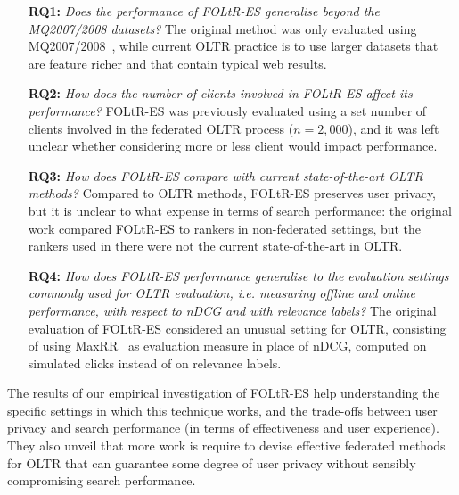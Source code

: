 \begin{itemize}
	\item[\bf RQ1:] \textit{Does the performance of FOLtR-ES generalise beyond the MQ2007/2008 datasets?} The original method was only evaluated using MQ2007/2008~\cite{DBLP:journals/corr/QinL13}, while current OLTR practice is to use larger datasets that are feature richer and that contain typical web results.
	\item[\bf RQ2:] \textit{How does the number of clients involved in FOLtR-ES affect its performance?} FOLtR-ES was previously evaluated using a set number of clients involved in the federated OLTR process ($n=2,000$), and it was left unclear whether considering more or less client would impact performance.
	\item[\bf RQ3:] \textit{How does FOLtR-ES compare with current state-of-the-art OLTR methods?} Compared to OLTR methods, FOLtR-ES preserves user privacy, but it is unclear to what expense in terms of search performance: the original work compared FOLtR-ES to rankers in non-federated settings, but the rankers used in there were not the current state-of-the-art in OLTR.
	\item[\bf RQ4:] \textit{How does FOLtR-ES performance generalise to the evaluation settings commonly used for OLTR evaluation, i.e. measuring offline and online performance, with respect to nDCG and with relevance labels?} The original evaluation of FOLtR-ES considered an unusual setting for OLTR, consisting of using MaxRR~\cite{radlinski2008learning} as evaluation measure in place of nDCG, computed on simulated clicks instead of on relevance labels.
\end{itemize}

The results of our empirical investigation of FOLtR-ES help understanding the specific settings in which this technique works, and the trade-offs between user privacy and search performance (in terms of effectiveness and user experience). They also unveil that more work is require to devise effective federated methods for OLTR that can guarantee some degree of user privacy without sensibly compromising search performance.